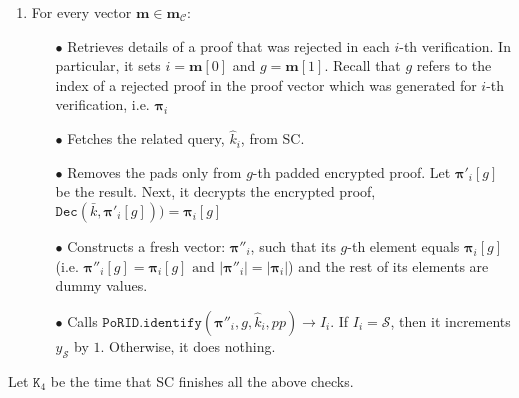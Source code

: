 \begin{enumerate}
\begin{enumerate}
\begin{enumerate}

\item\label{the-contract-loop} For every  vector $ {\bm{m}}\in {\bm{m}}_{\scriptscriptstyle \mathcal{C}}$:
\begin{itemize}
\item[$\bullet$]  Retrieves details of a proof that was rejected in each $i$-th verification.  In particular, it sets   $i= {\bm{m}}[0]$ and $g= {\bm{m}}[1]$. Recall that $g$ refers to the index of a rejected proof in the proof vector which was generated for $i$-th verification, i.e. $ {\bm{\pi}}_{\scriptscriptstyle i}$ 

\item[$\bullet$]  Fetches the related  query, $\hat{k}_{\scriptscriptstyle i}$, from SC.

\item[$\bullet$]  Removes the pads only from $g$-th padded encrypted proof. Let $ {\bm{\pi}}'_{\scriptscriptstyle i}[g]$ be the result. Next, it decrypts the  encrypted proof, $\mathtt{Dec}(\bar{k}, {\bm{\pi}}'_{\scriptscriptstyle i}[g]))= {\bm{\pi}}_{\scriptscriptstyle i}[g]$

\item[$\bullet$] \label{dummy-vector} Constructs a fresh vector: $ {\bm{\pi}}''_{\scriptscriptstyle i}$, such that  its $g$-th element equals $ {\bm{\pi}}_{\scriptscriptstyle i}[g]$ (i.e. $ {\bm{\pi}}''_{\scriptscriptstyle i}[g]=  {\bm{\pi}}_{\scriptscriptstyle i}[g] \text{ and } | {\bm{\pi}}''_{\scriptscriptstyle i}|= | {\bm{\pi}}_{\scriptscriptstyle i}|$) and the rest of its elements are dummy values. 

\item[$\bullet$] Calls   $\mathtt{PoRID.identify}( {\bm{\pi}}''_{\scriptscriptstyle i},g,\hat{k}_{\scriptscriptstyle i},pp)\rightarrow I_{\scriptscriptstyle i}$. If $I_{\scriptscriptstyle i}=\mathcal S$, then it increments $y_{\scriptscriptstyle\mathcal S}$  by $1$. Otherwise, it does nothing. 

\end{itemize}
\end{enumerate}
Let $\texttt{K}_{\scriptscriptstyle 4}$ be the time that SC finishes all the above checks.%

\end{enumerate} %


\end{enumerate}
